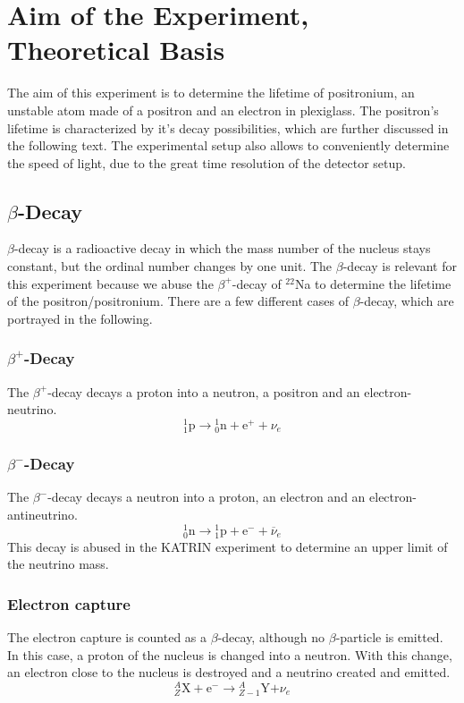 \chapter{Aim of the Experiment, Theoretical Basis }

The aim of this experiment is to determine the lifetime of positronium, an unstable atom made of a positron and an electron in plexiglass. The positron's lifetime is characterized by it's decay possibilities, which are further discussed in the following text. The experimental setup also allows to conveniently determine the speed of light, due to the great time resolution of the detector setup.

\section{$\beta$-Decay}
$\beta$-decay is a radioactive decay in which the mass number of the nucleus stays constant, but the ordinal number changes by one unit. The $\beta$-decay is relevant for this experiment because we abuse the $\beta^+$-decay of $^{22}$Na to determine the lifetime of the positron/positronium. There are a few different cases of $\beta$-decay, which are portrayed in the following.
\subsection{$\beta^+$-Decay}
The $\beta^+$-decay decays a proton into a neutron, a positron and an electron-neutrino.
$${}_{{1}}^{{1}}{\mathrm {p}}\to {}_{{0}}^{{1}}{\mathrm {n}}+{\mathrm {e}}^{{+}}+\nu _{e}$$

\subsection{$\beta^-$-Decay}
The $\beta^-$-decay decays a neutron into a proton, an electron and an electron-antineutrino.
$${}_{{0}}^{{1}}{\mathrm {n}}\to {}_{{1}}^{{1}}{\mathrm {p}}+{\mathrm {e}}^{{-}}+\overline {\nu }_{e}$$
This decay is abused in the KATRIN experiment to determine an upper limit of the neutrino mass. 
\subsection{Electron capture}
The electron capture is counted as a $\beta$-decay, although no $\beta$-particle is emitted. In this case, a proton of the nucleus is changed into a neutron. With this change, an electron close to the nucleus is destroyed and a neutrino created and emitted.  
$${\displaystyle {}_{Z}^{A}\mathrm {X} +\mathrm {e} ^{-}\to {}_{Z-1}^{A}\mathrm {Y} \mathrm {+} \nu _{e}}$$


